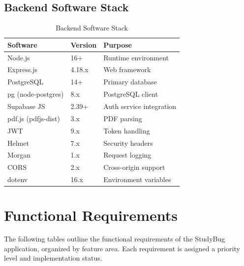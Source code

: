         \subsection{Backend Software Stack}
        \begin{table}[H]
        \centering
        \begin{tabular}{|l|l|l|}
        \hline
        \textbf{Software} & \textbf{Version} & \textbf{Purpose} \\
        \hline
        Node.js & 16+ & Runtime environment \\
        Express.js & 4.18.x & Web framework \\
        PostgreSQL & 14+ & Primary database \\
        pg (node-postgres) & 8.x & PostgreSQL client \\
        Supabase JS & 2.39+ & Auth service integration \\
        pdf.js (pdfjs-dist) & 3.x & PDF parsing \\
        JWT & 9.x & Token handling \\
        Helmet & 7.x & Security headers \\
        Morgan & 1.x & Request logging \\
        CORS & 2.x & Cross-origin support \\
        dotenv & 16.x & Environment variables \\
        \hline
        \end{tabular}
        \caption{Backend Software Stack}
        \end{table}

        \section{Functional Requirements}
        The following tables outline the functional requirements of the StudyBug application, organized by feature area. Each requirement is assigned a priority level and implementation status.


